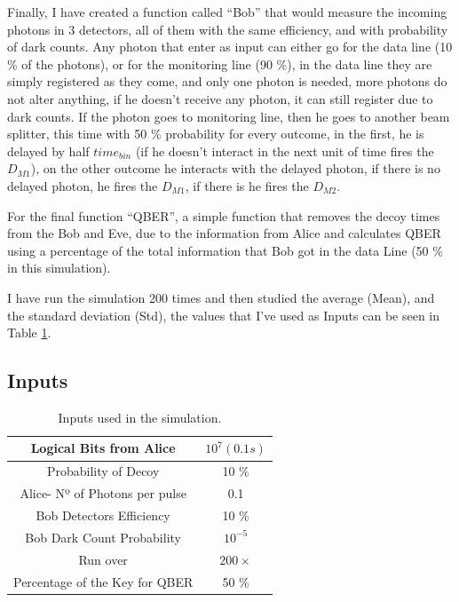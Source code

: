 \begin{refsection}
Finally, I have created a function called ``Bob'' that would measure the incoming photons in 3 detectors, all of them with the same efficiency, and with probability of dark counts. Any photon that enter as input can either go for the data line (10 \% of the photons), or for the monitoring line (90 \%), in the data line they are simply registered as they come, and only one photon is needed, more photons do not alter anything, if he doesn't receive any photon, it can still register due to dark counts. If the photon goes to monitoring line, then he goes to another beam splitter, this time with 50 \% probability for every outcome, in the first, he is delayed by half $time_{bin}$ (if he doesn't interact in the next unit of time fires the $D_{M1}$), on the other outcome he interacts with the delayed photon, if there is no delayed photon, he fires the $D_{M1}$, if there is he fires the $D_{M2}$.

For the final function ``QBER'', a simple function that removes the decoy times from the Bob and Eve, due to the information from Alice and calculates QBER using a percentage of the total information that Bob got in the data Line (50 \% in this simulation).

I have run the simulation 200 times and then studied the average (Mean), and the standard deviation (Std), the values that I've used as Inputs can be seen in Table \ref{Inputs}.

\subsection*{Inputs}

\begin{table}[hbt!]
\centering
\begin{tabular}{|c|c|}
\hline
\cellcolor[HTML]{005288}\color{white} Logical Bits from Alice & $10^{7} (0.1 s)$ \\ \hline
\cellcolor[HTML]{005288}\color{white} Probability of Decoy & 10 \% \\ \hline
\cellcolor[HTML]{005288}\color{white} Alice- Nº of Photons per pulse & 0.1\\ \hline
\cellcolor[HTML]{005288}\color{white} Bob Detectors Efficiency & 10 \% \\ \hline
\cellcolor[HTML]{005288}\color{white} Bob Dark Count Probability & $10^{-5}$ \\ \hline
\cellcolor[HTML]{005288}\color{white} Run over & $200 \times$\\ \hline
\cellcolor[HTML]{005288}\color{white} Percentage of the Key for QBER & 50 \% \\ \hline
\end{tabular}
\caption{Inputs used in the simulation.}
\label{Inputs}
\end{table}


\end{refsection}

